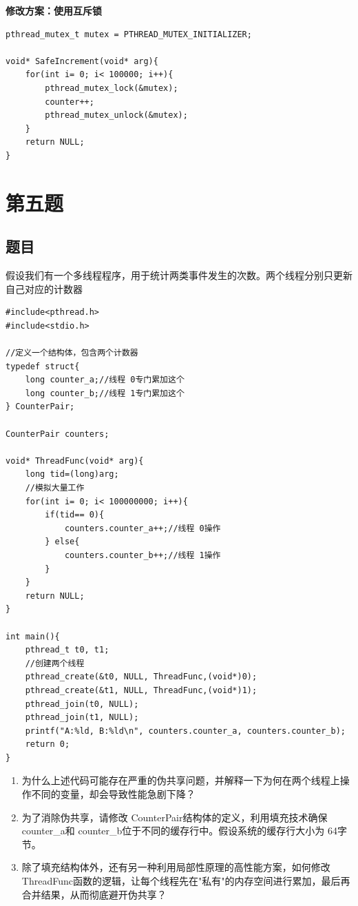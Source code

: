 \textbf{修改方案：使用互斥锁}
\begin{lstlisting}[style=cleancpp]
pthread_mutex_t mutex = PTHREAD_MUTEX_INITIALIZER;

void* SafeIncrement(void* arg){ 
    for(int i= 0; i< 100000; i++){ 
        pthread_mutex_lock(&mutex);
        counter++; 
        pthread_mutex_unlock(&mutex);
    } 
    return NULL; 
}
\end{lstlisting}


\chapter{第五题}

\section{题目}

假设我们有一个多线程程序，用于统计两类事件发生的次数。两个线程分别只更新自己对应的计数器
\begin{lstlisting}[style=cleancpp]
#include<pthread.h> 
#include<stdio.h>

//定义一个结构体，包含两个计数器 
typedef struct{ 
    long counter_a;//线程 0专门累加这个 
    long counter_b;//线程 1专门累加这个 
} CounterPair;

CounterPair counters;

void* ThreadFunc(void* arg){ 
    long tid=(long)arg; 
    //模拟大量工作 
    for(int i= 0; i< 100000000; i++){ 
        if(tid== 0){ 
            counters.counter_a++;//线程 0操作 
        } else{ 
            counters.counter_b++;//线程 1操作 
        } 
    } 
    return NULL; 
}

int main(){ 
    pthread_t t0, t1; 
    //创建两个线程 
    pthread_create(&t0, NULL, ThreadFunc,(void*)0); 
    pthread_create(&t1, NULL, ThreadFunc,(void*)1);
    pthread_join(t0, NULL); 
    pthread_join(t1, NULL);
    printf("A:%ld, B:%ld\n", counters.counter_a, counters.counter_b); 
    return 0; 
}
\end{lstlisting}

\begin{enumerate}
    \item 为什么上述代码可能存在严重的伪共享问题，并解释一下为何在两个线程上操作不同的变量，却会导致性能急剧下降？
    \item 为了消除伪共享，请修改 CounterPair结构体的定义，利用填充技术确保 counter\_a和 counter\_b位于不同的缓存行中。假设系统的缓存行大小为 64字节。
    \item 除了填充结构体外，还有另一种利用局部性原理的高性能方案，如何修改 ThreadFunc函数的逻辑，让每个线程先在"私有"的内存空间进行累加，最后再合并结果，从而彻底避开伪共享？
\end{enumerate}


